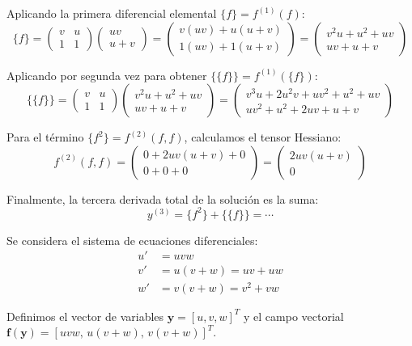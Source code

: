 Aplicando la primera diferencial elemental $\{f\} = f^{(1)}(f)$:
$$ \{f\} = \begin{pmatrix} v & u \\ 1 & 1 \end{pmatrix} \begin{pmatrix} uv \\ u+v \end{pmatrix} = \begin{pmatrix} v(uv) + u(u+v) \\ 1(uv) + 1(u+v) \end{pmatrix} = \begin{pmatrix} v^2u + u^2 + uv \\ uv + u + v \end{pmatrix} $$

Aplicando por segunda vez para obtener $\{\{f\}\} = f^{(1)}(\{f\})$:
$$ \{\{f\}\} = \begin{pmatrix} v & u \\ 1 & 1 \end{pmatrix} \begin{pmatrix} v^2u + u^2 + uv \\ uv + u + v \end{pmatrix} = \begin{pmatrix} v^3u + 2u^2v + uv^2 + u^2 + uv \\ uv^2 + u^2 + 2uv + u + v \end{pmatrix} $$

Para el término $\{f^2\} = f^{(2)}(f, f)$, calculamos el tensor Hessiano:
$$ f^{(2)}(f, f) = \begin{pmatrix} 0 + 2uv(u+v) + 0 \\ 0 + 0 + 0 \end{pmatrix} = \begin{pmatrix} 2uv(u+v) \\ 0 \end{pmatrix} $$

Finalmente, la tercera derivada total de la solución es la suma:
$$ y^{(3)} = \{f^2\} + \{\{f\}\} =\cdots $$

Se considera el sistema de ecuaciones diferenciales:
\begin{align*}
    u' &= uvw \\
    v' &= u(v + w) = uv + uw \\
    w' &= v(v + w) = v^2 + vw
\end{align*}

Definimos el vector de variables $\mathbf{y} = [u, v, w]^T$ y el campo vectorial $\mathbf{f}(\mathbf{y}) = [uvw, \, u(v+w), \, v(v+w)]^T$.

